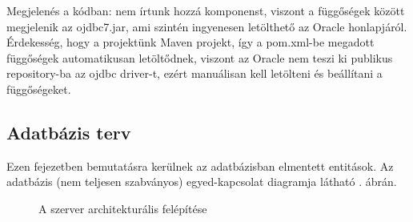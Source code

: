 \documentclass[11pt, a4paper]{article}
\begin{document}
    Megjelenés a kódban: nem írtunk hozzá komponenst, viszont a függőségek között megjelenik az ojdbc7.jar, ami szintén ingyenesen letölthető az Oracle honlapjáról. Érdekesség, hogy a projektünk Maven projekt, így a pom.xml-be megadott függőségek automatikusan letöltődnek, viszont az Oracle nem teszi ki publikus repository-ba az ojdbc driver-t, ezért manuálisan kell letölteni és beállítani a függőségeket.
    
    \subsection{Adatbázis terv}
    Ezen fejezetben bemutatásra kerülnek az adatbázisban elmentett entitások. Az adatbázis (nem teljesen szabványos) egyed-kapcsolat diagramja látható . ábrán.
    
    \begin{figure}[htbp]
    	\center
    	\caption{A szerver architekturális felépítése}
    	\label{fig:er_diag}
    \end{figure}
    
\end{document}
